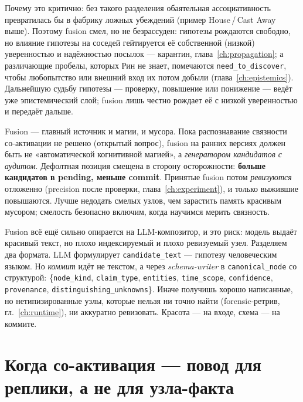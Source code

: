 Почему это критично: без такого разделения обаятельная ассоциативность превратилась
бы в фабрику ложных убеждений (пример House\,/\,Cast Away выше). Поэтому fusion смел,
но не безрассуден: гипотезы рождаются свободно, но влияние гипотезы на соседей
гейтируется её собственной (низкой) уверенностью и надёжностью посылок — карантин,
глава~\ref{ch:propagation}; а различающие пробелы, которых Рин не знает, помечаются
\texttt{need\_to\_discover}, чтобы любопытство или внешний вход их потом добыли
(глава~\ref{ch:epistemics}). Дальнейшую судьбу гипотезы — проверку, повышение или
понижение — ведёт уже эпистемический слой; fusion лишь честно рождает её с низкой
уверенностью и передаёт дальше.

\begin{principle}
Fusion — главный источник и магии, и мусора. Пока распознавание связности
со-активации не решено (открытый вопрос), fusion на ранних версиях должен быть не
«автоматической когнитивной магией», а \emph{генератором кандидатов с аудитом}.
Дефолтная позиция смещена в сторону осторожности: \textbf{больше кандидатов в
pending, меньше commit}. Принятые fusion потом \emph{ревизуются} отложенно (precision
после проверки, глава~\ref{ch:experiment}), и только выжившие повышаются. Лучше
недодать смелых узлов, чем зарастить память красивым мусором; смелость безопасно
включим, когда научимся мерить связность.
\end{principle}

\begin{principle}
Fusion всё ещё сильно опирается на LLM-композитор, и это риск: модель выдаёт красивый
текст, но плохо индексируемый и плохо ревизуемый узел. Разделяем два формата. LLM
формулирует \texttt{candidate\_text} — гипотезу человеческим языком. Но \emph{коммит}
идёт не текстом, а через \emph{schema-writer} в \texttt{canonical\_node} со
структурой: \{\texttt{node\_kind}, \texttt{claim\_type}, \texttt{entities},
\texttt{time\_scope}, \texttt{confidence}, \texttt{provenance},
\texttt{distinguishing\_unknowns}\}. Иначе получишь хорошо написанные, но
нетипизированные узлы, которые нельзя ни точно найти (forensic-ретрив,
гл.~\ref{ch:runtime}), ни аккуратно ревизовать. Красота — на входе, схема — на
коммите.
\end{principle}

\section{Когда со-активация — повод для реплики, а не для узла-факта}
\label{sec:antifusion-joke}

